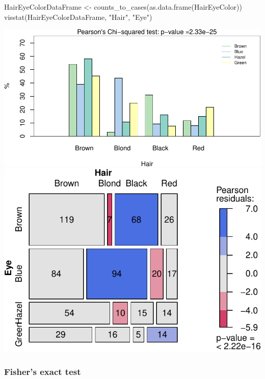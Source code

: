 \documentclass[
]{article}
\newenvironment{Shaded}{\begin{snugshade}}{\end{snugshade}}
\newcommand{\FunctionTok}[1]{\textcolor[rgb]{0.00,0.00,0.00}{#1}}
\newcommand{\NormalTok}[1]{#1}
\newcommand{\OtherTok}[1]{\textcolor[rgb]{0.56,0.35,0.01}{#1}}
\newcommand{\StringTok}[1]{\textcolor[rgb]{0.31,0.60,0.02}{#1}}
\begin{document}
\begin{Shaded}
\begin{Highlighting}[]
\NormalTok{HairEyeColorDataFrame }\OtherTok{\textless{}{-}} \FunctionTok{counts\_to\_cases}\NormalTok{(}\FunctionTok{as.data.frame}\NormalTok{(HairEyeColor))}
\FunctionTok{visstat}\NormalTok{(HairEyeColorDataFrame, }\StringTok{"Hair"}\NormalTok{, }\StringTok{"Eye"}\NormalTok{)}
\end{Highlighting}
\end{Shaded}

\includegraphics[width=1\linewidth]{man/figures/README-unnamed-chunk-10-1}
\includegraphics[width=1\linewidth]{man/figures/README-unnamed-chunk-10-2}

\hypertarget{fishers-exact-test}{%
\subsubsection{Fisher's exact test}\label{fishers-exact-test}}
\end{document}
